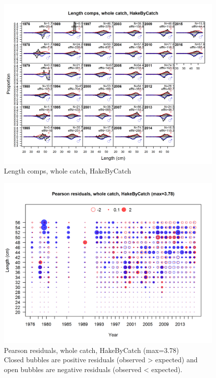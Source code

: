 \documentclass[12pt,]{article}
\begin{document}
\begin{figure}[htbp]
\centering
\includegraphics{./r4ss/plots_mod1/comp_lenfit_flt2mkt0.png}
\caption{Length comps, whole catch, HakeByCatch
\label{fig:mod1_10_comp_lenfit_flt2mkt0}}
\end{figure}

\begin{figure}[htbp]
\centering
\includegraphics{./r4ss/plots_mod1/comp_lenfit_residsflt2mkt0.png}
\caption{Pearson residuals, whole catch, HakeByCatch (max=3.78)\\
Closed bubbles are positive residuals (observed \textgreater{} expected)
and open bubbles are negative residuals (observed \textless{} expected).
\label{fig:mod1_11_comp_lenfit_residsflt2mkt0}}
\end{figure}
\end{document}
